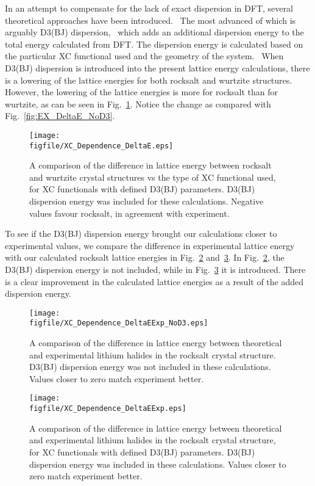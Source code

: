 \documentclass[titlepage,11pt]{article}
\newcommand{\figfile}{C:/Users/Hayden/Documents/Patey_Lab/ThesisCodeBase/Manuscript_1.0/figures}
\begin{document}
In an attempt to compensate for the lack of exact dispersion in DFT, several theoretical approaches have been introduced.~\cite{burns2011density} The most advanced of which is arguably D3(BJ) dispersion,~\cite{Grimme2010,grimme2016dispersion,Becke2007,Grimme2011} which adds an additional dispersion energy to the total energy calculated from DFT. The dispersion energy is calculated based on the particular XC functional used and the geometry of the system.~\cite{grimme2016dispersion} When D3(BJ) dispersion is introduced into the present lattice energy calculations, there is a lowering of the lattice energies for both rocksalt and wurtzite structures. However, the lowering of the lattice energies is more for rocksalt than for wurtzite, as can be seen in Fig.~\ref{fig:EX_DeltaE}. Notice the change as compared with Fig.~\ref{fig:EX_DeltaE_NoD3}.
%
\begin{figure}
	\texttt{[image: \\figfile/XC\_Dependence\_DeltaE.eps]}
	\caption{\label{fig:EX_DeltaE} A comparison of the difference in lattice energy between rocksalt and wurtzite crystal structures vs the type of XC functional used, for XC functionals with defined D3(BJ) parameters. D3(BJ) dispersion energy was included for these calculations. Negative values favour rocksalt, in agreement with experiment.}
\end{figure}
%
To see if the D3(BJ) dispersion energy brought our calculations closer to experimental values, we compare the difference in experimental lattice energy~\cite{book:CRC} with our calculated rocksalt lattice energies in Fig.~\ref{fig:EX_DeltaEExp_NoD3} and~\ref{fig:EX_DeltaEExp}. In Fig.~\ref{fig:EX_DeltaEExp_NoD3}, the D3(BJ) dispersion energy is not included, while in Fig.~\ref{fig:EX_DeltaEExp} it is introduced. There is a clear improvement in the calculated lattice energies as a result of the added dispersion energy.
%
\begin{figure}
	\texttt{[image: \\figfile/XC\_Dependence\_DeltaEExp\_NoD3.eps]}
	\caption{\label{fig:EX_DeltaEExp_NoD3} A comparison of the difference in lattice energy between theoretical and experimental lithium halides in the rocksalt crystal structure. D3(BJ) dispersion energy was not included in these calculations. Values closer to zero match experiment better.}
\end{figure}
%
\begin{figure}
	\texttt{[image: \\figfile/XC\_Dependence\_DeltaEExp.eps]}
	\caption{\label{fig:EX_DeltaEExp} A comparison of the difference in lattice energy between theoretical and experimental lithium halides in the rocksalt crystal structure, for XC functionals with defined D3(BJ) parameters. D3(BJ) dispersion energy was included in these calculations. Values closer to zero match experiment better.}
\end{figure}
\end{document}
